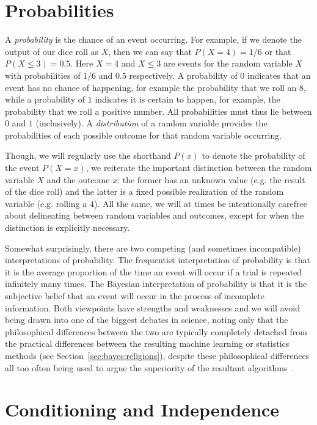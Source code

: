 \section{Probabilities}
\label{sec:prob:prob}

A \emph{probability} is
the chance of an event occurring.  For example, if we denote the output
of our dice roll as $X$, then we can say that $P(X=4) = 1/6$ or that $P(X\le3) = 0.5$.  Here
$X=4$ and $X\le3$ are events for the random variable $X$ with probabilities of $1/6$ and $0.5$
respectively.   A probability of $0$ indicates that an event has no chance of happening, 
for example the probability that we roll an $8$, while
a probability of $1$ indicates it is certain to happen, for example, the probability 
that we roll a positive number.  All probabilities must thus lie between $0$ and $1$ 
(inclusively).  
A \emph{distribution} of a random variable provides the probabilities of each possible 
outcome for that random variable occurring.

Though, we will regularly use the shorthand $P(x)$ to denote the probability of the 
event $P(X=x)$,
we reiterate the important distinction between the random variable $X$ and the outcome $x$:
the former has an unknown value (e.g. the result of the dice roll) and the latter is
a fixed possible realization of the random variable (e.g. rolling a $4$).
All the same, we will at times be intentionally carefree about delineating between
random variables and outcomes, except for when the distinction is explicitly necessary.

Somewhat surprisingly, there are two competing (and sometimes incompatible)
interpretations of probability.  The frequentist interpretation of
probability is that it is the average proportion of the time an event will occur if a trial is 
repeated infinitely many times.  The Bayesian interpretation of probability is that it is the subjective
belief that an event will occur in the process of incomplete information.  Both viewpoints have
strengths and weaknesses and we will avoid being drawn into one of the biggest debates in
science, noting only that the philosophical differences between the two are typically completely
detached from the practical differences between the resulting machine learning or statistics
methods (see Section~\ref{sec:bayes:religions}), despite these philosophical differences all too 
often being used to argue the superiority of the resultant algorithms~\citep{gelman2011induction,steinhardt2012beyond}.

\section{Conditioning and Independence}
\label{sec:prob:cond}


